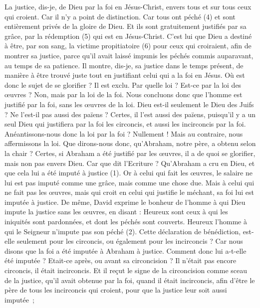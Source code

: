 \begin{multicols}{2}
La justice, dis-je, de Dieu par la foi en Jésus-Christ, envers tous et sur tous ceux qui croient. Car il n'y a point de distinction.
Car tous ont péché (4) et sont entièrement privés de la gloire de Dieu.
Et ils sont gratuitement justifiés par sa grâce, par la rédemption (5) qui est en Jésus-Christ.
C’est lui que Dieu a destiné à être, par son sang, la victime propitiatoire (6) pour ceux qui croiraient, afin de montrer sa justice, parce qu’il avait laissé impunis les péchés commis auparavant, au temps de sa patience.
Il montre, dis-je, sa justice dans le temps présent, de manière à être trouvé juste tout en justifiant celui qui a la foi en Jésus.
Où est donc le sujet de se glorifier ? Il est exclu. Par quelle loi ? Est-ce par la loi des œuvres ? Non, mais par la loi de la foi.
Nous concluons donc que l'homme est justifié par la foi, sans les œuvres de la loi.
Dieu est-il seulement le Dieu des Juifs ? Ne l'est-il pas aussi des païens ? Certes, il l'est aussi des païens,
puisqu’il y a un seul Dieu qui justifiera par la foi les circoncis, et aussi les incirconcis par la foi.
Anéantissons-nous donc la loi par la foi ? Nullement ! Mais au contraire, nous affermissons la loi.
\VerseOne{}Que dirons-nous donc, qu'Abraham, notre père, a obtenu selon la chair ?
Certes, si Abraham a été justifié par les œuvres, il a de quoi se glorifier, mais non pas envers Dieu.
Car que dit l'Ecriture ? Qu’Abraham a cru en Dieu, et que cela lui a été imputé à justice (1).
Or à celui qui fait les œuvres, le salaire ne lui est pas imputé comme une grâce, mais comme une chose due.
Mais à celui qui ne fait pas les œuvres, mais qui croit en celui qui justifie le méchant, sa foi lui est imputée à justice.
De même, David exprime le bonheur de l'homme à qui Dieu impute la justice sans les œuvres, en disant :
Heureux sont ceux à qui les iniquités sont pardonnées, et dont les péchés sont couverts.
Heureux l'homme à qui le Seigneur n’impute pas son péché (2).
Cette déclaration de bénédiction, est-elle seulement pour les circoncis, ou également pour les incirconcis ? Car nous disons que la foi a été imputée à Abraham à justice.
Comment donc lui a-t-elle été imputée ? Etait-ce après, ou avant sa circoncision ? Il n’était pas encore circoncis, il était incirconcis.
Et il reçut le signe de la circoncision comme sceau de la justice, qu’il avait obtenue par la foi, quand il était incirconcis, afin d’être le père de tous les incirconcis qui croient, pour que la justice leur soit aussi imputée ;

\end{multicols}
